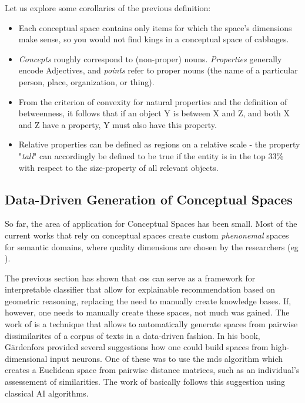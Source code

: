 Let us explore some corollaries of the previous definition:

\begin{itemize}
    \item Each conceptual space contains only items for which the space's dimensions make sense, so you would not find kings in a conceptual space of cabbages.
    \item \textit{Concepts} roughly correspond to (non-proper) nouns. \textit{Properties} generally encode Adjectives, and \textit{points} refer to proper nouns (the name of \eg a particular person, place, organization, or thing).
    \item From the criterion of convexity for natural properties and the definition of betweenness, it follows that if an object Y is between X and Z, and both X and Z have a property, Y must also have this property.
    \item Relative properties can be defined as regions on a relative scale - the property "\textit{tall}" can accordingly be defined to be true if the entity is in the top 33\% with respect to the size-property of all relevant objects.
\end{itemize}


\subsection{Data-Driven Generation of Conceptual Spaces}
\label{sec:generate_cs}

So far, the area of application for Conceptual Spaces has been small. Most of the current works that rely on conceptual spaces create custom \textit{phenonemal} spaces for semantic domains, where quality dimensions are chosen by the researchers (eg \cite{Schockaert2011}). 

The previous section has shown that \glspl{cs} can serve as a framework for interpretable classifier that allow for explainable recommendation based on geometric reasoning, replacing the need to manually create knowledge bases. If, however, one needs to manually create these spaces, not much was gained. The work of \cite{Derrac2015} is a technique that allows to automatically generate spaces from pairwise dissimilarites of a corpus of texts in a data-driven fashion. In his book, Gärdenfors provided several suggestions how one could build spaces from high-dimensional input neurons. One of these was to use the \gls{mds} algorithm which creates a Euclidean space from pairwise distance matrices, such as an individual's assessement of similarities. The work of \cite{Derrac2015} basically follows this suggestion using classical AI algorithms. %

